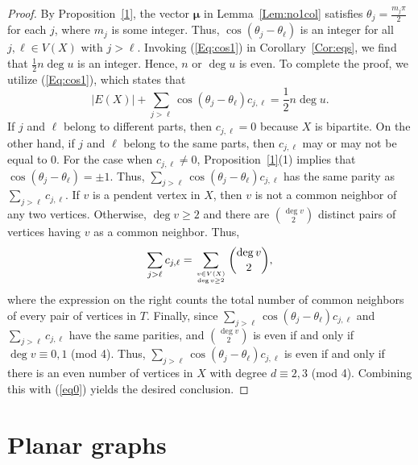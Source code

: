 \documentclass[11pt]{article}
\newcommand{\bmu}{{\boldsymbol{\mu}}}
\begin{document}
\begin{proof}
By Proposition~\ref{1}, the vector $\bmu$ in Lemma~\ref{Lem:no1col} satisfies $\theta_j=\frac{m_j\pi}{2}$ for each $j$, where $m_j$ is some integer. Thus, $\cos(\theta_j-\theta_{\ell})$ is an integer for all $j,\ell\in V(X)$ with $j>\ell$. Invoking (\ref{Eq:cos1}) in Corollary~\ref{Cor:eqs}, we find that $\frac{1}{2}n\operatorname{deg}u$ is an integer. Hence, $n$ or $\operatorname{deg}u$ is even. To complete the proof, we utilize (\ref{Eq:cos1}), which states that
\begin{equation}
\label{eq0}
|E(X)|+\sum_{j>\ell}\cos(\theta_j-\theta_{\ell})c_{j,\ell}=\frac{1}{2}n\operatorname{deg}u.
\end{equation}
If $j$ and $\ell$ belong to different parts, then $c_{j,\ell}=0$ because $X$ is bipartite. On the other hand, if $j$ and $\ell$ belong to the same parts, then $c_{j,\ell}$ may or may not be equal to 0. For the case when $c_{j,\ell}\neq 0$, Proposition~\ref{1}(1) implies that $\cos(\theta_j-\theta_{\ell})=\pm 1$. Thus, $\sum_{j>\ell}\cos(\theta_j-\theta_{\ell})c_{j,\ell}$ has the same parity as $\sum_{j>\ell}c_{j,\ell}$. 
If $v$ is a pendent vertex in $X$, then $v$ is not a common neighbor of any two vertices. Otherwise, $\operatorname{deg}v\geq 2$ and there are ${\operatorname{deg}v\choose 2}$ distinct pairs of vertices having $v$ as a common neighbor. Thus, 
\begin{equation}
\label{q}
\sum_{j>\ell}c_{j,\ell}=\sum_{{v\in V(X)}\atop{\operatorname{deg}v\geq 2}}{\operatorname{deg}v\choose 2},
\end{equation}
where the expression on the right counts the total number of common neighbors of every pair of vertices in $T$. Finally, since $\sum_{j>\ell}\cos(\theta_j-\theta_{\ell})c_{j,\ell}$ and $\sum_{j>\ell}c_{j,\ell}$ have the same parities, and ${\operatorname{deg}v\choose 2}$ is even if and only if $\operatorname{deg}v\equiv 0,1$ (mod 4). Thus, $\sum_{j>\ell}\cos(\theta_j-\theta_{\ell})c_{j,\ell}$ is even if and only if there is an even number of vertices in $X$ with degree $d\equiv 2,3$ (mod 4). Combining this with (\ref{eq0}) yields the desired conclusion.
\end{proof}

\section{Planar graphs}\label{sec:plan}
\end{document}
